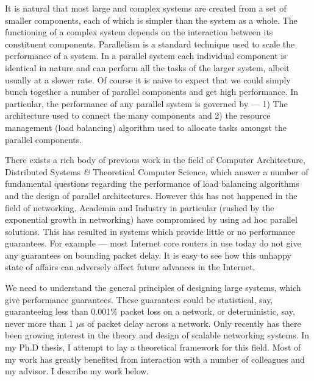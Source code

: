 \documentclass[a4paper, 12pt]{article}
\begin{document}
\begin{small}

It is natural that most large and complex systems are created from a set
of smaller components, each of which is simpler than the system as a whole.
The functioning of a complex system depends on the interaction between its
constituent components. Parallelism is a standard technique used to scale the
performance of a system. In a parallel system each individual component is
identical in nature and can perform all the tasks of the larger system,
albeit usually at a slower rate. Of course it is naive to expect that
we could simply bunch together a number of parallel components and get high performance.
In particular, the performance of any parallel system is governed by --- 1) The
architecture used to connect the many components and 2) the
resource management (load balancing) algorithm used to
allocate tasks amongst the parallel components.



There exists a rich body of previous work in the field of Computer Architecture,
Distributed Systems {\it \&}  Theoretical Computer Science, which answer a number of
fundamental questions regarding the performance of load balancing algorithms and
the design of parallel architectures.
However this has not happened in the field of networking.
Academia and Industry in particular (rushed by the exponential growth in networking)
have compromised by using ad hoc parallel solutions. This has resulted in systems
which provide little or no performance guarantees.
For example --- most Internet core routers in use today do not give any
guarantees on bounding packet delay.
It is easy to see how this unhappy state of affairs can adversely affect
future advances in the Internet.

We need to understand the general principles of designing large systems,
which give performance guarantees. These guarantees could be statistical, say, guaranteeing less
than 0.001\% packet loss on a network, or deterministic, say, never more than 1 $\mu$s of packet
delay across a network. Only recently has there been growing interest in the
theory and design of scalable networking systems.
In my Ph.D thesis, I attempt to lay a theoretical framework for this field.
Most of my work has greatly benefited from interaction with a number of colleagues and my advisor.
I describe my work below.


\end{small}
\end{document}
